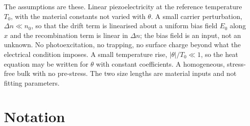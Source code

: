 \documentclass[11pt]{article}
\begin{document}
The assumptions are these. Linear piezoelectricity at the reference temperature $T_0$, with the material
constants not varied with $\theta$. A small carrier perturbation, $\Delta n\ll n_0$, so that the drift
term is linearised about a uniform bias field $E_0$ along $x$ and the recombination term is linear in
$\Delta n$; the bias field is an input, not an unknown. No photoexcitation, no trapping, no surface charge
beyond what the electrical condition imposes. A small temperature rise, $|\theta|/T_0\ll1$, so the heat
equation may be written for $\theta$ with constant coefficients. A homogeneous, stress-free bulk with no
pre-stress. The two size lengths are material inputs and not fitting parameters.

\section{Notation}\label{sec:notation}
\end{document}
